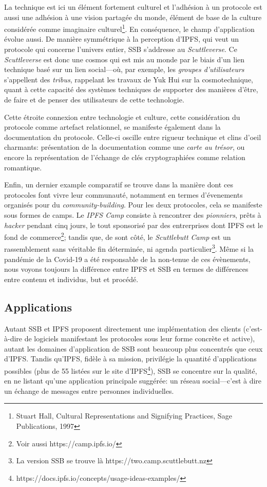 \documentclass{article}
\begin{document}
La technique est ici un élément fortement culturel et l'adhésion à un protocole est aussi une adhésion à une vision partagée du monde, élément de base de la culture considérée comme imaginaire culturel\footnote{Stuart Hall, Cultural Representations and Signifying Practices, Sage Publications, 1997}. En conséquence, le champ d'application évolue aussi. De manière symmétrique à la perception d'IPFS, qui veut un protocole qui concerne l'univers entier, SSB s'addresse au \emph{Scuttleverse}. Ce \emph{Scuttleverse} est donc une cosmos qui est mis au monde par le biais d'un lien technique basé sur un lien social—où, par exemple, les \emph{groupes d'utilisateurs} s'appellent des \emph{tribus}, rappelant les travaux de Yuk Hui sur la cosmotechnique, quant à cette capacité des systèmes techniques de supporter des manières d'être, de faire et de penser des utilisateurs de cette technologie.

Cette étroite connexion entre technologie et culture, cette considération du protocole comme artefact relationnel, se manifeste également dans la documentation du protocole. Celle-ci oscille entre rigueur technique et clins d'oeil charmants: présentation de la documentation comme une \emph{carte au trésor}, ou encore la représentation de l'échange de clés cryptographiées comme relation romantique.

Enfin, un dernier example comparatif se trouve dans la manière dont ces protocoles font vivre leur communauté, notamment en termes d'évenements organisés pour du \emph{community-building}. Pour les deux protocoles, cela se manifeste sous formes de camps. Le \emph{IPFS Camp} consiste à rencontrer des \emph{pionniers}, prêts à \emph{hacker} pendant cinq jours, le tout sponsorisé par des entrerprises dont IPFS est le fond de commerce\footnote{Voir aussi https://camp.ipfs.io/}; tandis que, de sont côté, le \emph{Scuttlebutt Camp} est un rassemblement sans véritable fin déterminée, ni agenda particulier\footnote{La version SSB se trouve là https://two.camp.scuttlebutt.nz}. Même si la pandémie de la Covid-19 a été responsable de la non-tenue de ces évènements, nous voyons toujours la différence entre IPFS et SSB en termes de différences entre contenu et individus, but et procédé.

\subsection{Applications}

Autant SSB et IPFS proposent directement une implémentation des clients (c'est-à-dire de logiciels manifestant les protocoles sous leur forme concrète et active), autant les domaines d'application de SSB sont beaucoup plus concentrés que ceux d'IPFS. Tandis qu'IPFS, fidèle à sa mission, privilégie la quantité d'applications possibles (plus de 55 listées sur le site d'IPFS\footnote{https://docs.ipfs.io/concepts/usage-ideas-examples/}), SSB se concentre sur la qualité, en ne listant qu'une application principale suggérée: un réseau social—c'est à dire un échange de messages entre personnes individuelles.
\end{document}

